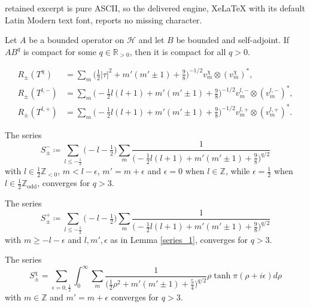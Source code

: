 \documentclass[10pt,a4paper]{amsart}
\begin{document}
retained excerpt is pure ASCII, so the delivered engine, XeLaTeX with its default Latin Modern text font, reports no missing character.
\begin{lemma}\label{compactness_powers}
    Let $A$ be a bounded operator on $\mathcal{H}$ and let $B$ be bounded and self-adjoint. If $AB^q$ is compact for some $q\in\mathbb{R}_{>0}$, then it is compact for all $q>0$.
\end{lemma}

\begin{equation}\label{eq_action_R}
    \begin{aligned}
        R_\pm(T^\chi)&=\sum_m\Big(\tfrac{1}{2}|\tau|^2+m'(m'\pm1)+\tfrac{9}{8}\Big)^{-1/2} v^\chi_m\otimes (v^\chi_m)^*,\\
        R_\pm(T^{l,-})&=\sum_m \Big(-\tfrac{1}{2}l(l+1)+m'(m'\pm1)+\tfrac{9}{8}\Big)^{-1/2} v_m^{l,-}\otimes (v_m^{l,-})^*,\\
        R_\pm(T^{l,+})&=\sum_m \Big(-\tfrac{1}{2}l(l+1)+m'(m'\pm1)+\tfrac{9}{8}\Big)^{-1/2} v_m^{l,+}\otimes (v_m^{l,+})^*.
    \end{aligned}
\end{equation}

\begin{lemma}\label{series_1}
    The series
    \begin{equation*}
        S^-_\pm\coloneq\sum_{l\leq-\tfrac{1}{2}}\Big(-l-\tfrac{1}{2}\Big)\sum_m \frac{1}{\Big(-\tfrac{1}{2}l(l+1)+m'(m'\pm 1)+\tfrac{9}{8}\Big)^{q/2}}
    \end{equation*}
    with $l\in\tfrac{1}{2}\mathbb{Z}_{<0}$, $m<l-\epsilon$, $m'=m+\epsilon$ and $\epsilon=0$ when $l\in\mathbb{Z}$, while $\epsilon=\tfrac{1}{2}$ when $l\in\tfrac{1}{2}\mathbb{Z}_\mathrm{odd}$, converges for $q>3$. 
\end{lemma}

\begin{lemma}\label{series_2}
    The series
    \begin{equation*}
        S^+_\pm\coloneq\sum_{l\leq-\tfrac{1}{2}}\Big(-l-\tfrac{1}{2}\Big)\sum_m\frac{1}{\Big(-\tfrac{1}{2}l(l+1)+m'(m'\pm 1)+\tfrac{9}{8}\Big)^{q/2}}
    \end{equation*}
    with $m\geq-l-\epsilon$ and $l,m',\epsilon$ as in Lemma \ref{series_1}, converges for $q>3$.
\end{lemma}

\begin{lemma}\label{series_3}
    The series
    \begin{equation*}
        S^\chi_\pm=\sum_{\epsilon=0,\tfrac{1}{2}}\int_0^\infty \sum_m\frac{1}{\Big(\tfrac{1}{2}\rho^2+m'(m'\pm1)+\tfrac{5}{4}\Big)^{q/2}}\rho\tanh\pi(\rho+i\epsilon)d\rho
    \end{equation*}
    with $m\in\mathbb{Z}$ and $m'=m+\epsilon$ converges for $q>3$.
\end{lemma}
\end{document}
